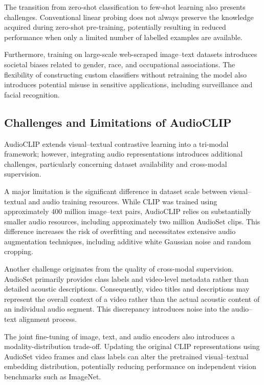 \documentclass[pdflatex,sn-mathphys-num]{sn-jnl}%
\theoremstyle{thmstyleone}%
\theoremstyle{thmstyletwo}%
\theoremstyle{thmstylethree}%
\begin{document}
The transition from zero-shot classification to few-shot learning also presents challenges. Conventional linear probing does not always preserve the knowledge acquired during zero-shot pre-training, potentially resulting in reduced performance when only a limited number of labelled examples are available.

Furthermore, training on large-scale web-scraped image--text datasets introduces societal biases related to gender, race, and occupational associations. The flexibility of constructing custom classifiers without retraining the model also introduces potential misuse in sensitive applications, including surveillance and facial recognition.

\subsection{Challenges and Limitations of AudioCLIP}

AudioCLIP extends visual--textual contrastive learning into a tri-modal framework; however, integrating audio representations introduces additional challenges, particularly concerning dataset availability and cross-modal supervision.

A major limitation is the significant difference in dataset scale between visual--textual and audio training resources. While CLIP was trained using approximately 400 million image--text pairs, AudioCLIP relies on substantially smaller audio resources, including approximately two million AudioSet clips. This difference increases the risk of overfitting and necessitates extensive audio augmentation techniques, including additive white Gaussian noise and random cropping.

Another challenge originates from the quality of cross-modal supervision. AudioSet primarily provides class labels and video-level metadata rather than detailed acoustic descriptions. Consequently, video titles and descriptions may represent the overall context of a video rather than the actual acoustic content of an individual audio segment. This discrepancy introduces noise into the audio--text alignment process.

The joint fine-tuning of image, text, and audio encoders also introduces a modality-distribution trade-off. Updating the original CLIP representations using AudioSet video frames and class labels can alter the pretrained visual--textual embedding distribution, potentially reducing performance on independent vision benchmarks such as ImageNet.
\end{document}
